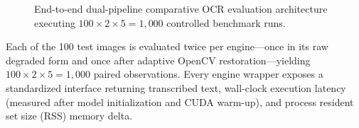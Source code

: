 \documentclass[11pt,a4paper]{article}
\begin{document}
\begin{figure}[H]
    \centering
    \caption{End-to-end dual-pipeline comparative OCR evaluation architecture executing $100 \times 2 \times 5 = 1{,}000$ controlled benchmark runs.}
    \label{fig:pipeline}
\end{figure}

Each of the 100 test images is evaluated twice per engine—once in its raw degraded form and once after adaptive OpenCV restoration—yielding $100 \times 2 \times 5 = 1{,}000$ paired observations. Every engine wrapper exposes a standardized interface returning transcribed text, wall-clock execution latency (measured after model initialization and CUDA warm-up), and process resident set size (RSS) memory delta.
\end{document}
